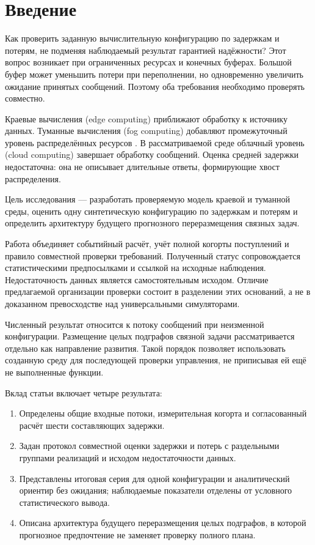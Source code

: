 \hypertarget{ux432ux432ux435ux434ux435ux43dux438ux435}{%
\section{Введение}}

Как проверить заданную вычислительную конфигурацию по задержкам и потерям, не подменяя наблюдаемый результат гарантией надёжности? Этот вопрос возникает при ограниченных ресурсах и конечных буферах. Большой буфер может уменьшить потери при переполнении, но одновременно увеличить ожидание принятых сообщений. Поэтому оба требования необходимо проверять совместно.

Краевые вычисления (edge computing) приближают обработку к источнику данных. Туманные вычисления (fog computing) добавляют промежуточный уровень распределённых ресурсов \cite{bonomi,shi}. В рассматриваемой среде облачный уровень (cloud computing) завершает обработку сообщений. Оценка средней задержки недостаточна: она не описывает длительные ответы, формирующие хвост распределения.

Цель исследования --- разработать проверяемую модель краевой и туманной среды, оценить одну синтетическую конфигурацию по задержкам и потерям и определить архитектуру будущего прогнозного переразмещения связных задач.

Работа объединяет событийный расчёт, учёт полной когорты поступлений и правило совместной проверки требований. Полученный статус сопровождается статистическими предпосылками и ссылкой на исходные наблюдения. Недостаточность данных является самостоятельным исходом. Отличие предлагаемой организации проверки состоит в разделении этих оснований, а не в доказанном превосходстве над универсальными симуляторами.

Численный результат относится к потоку сообщений при неизменной конфигурации. Размещение целых подграфов связной задачи рассматривается отдельно как направление развития. Такой порядок позволяет использовать созданную среду для последующей проверки управления, не приписывая ей ещё не выполненные функции.

Вклад статьи включает четыре результата:

\begin{enumerate}
\def\labelenumi{\arabic{enumi}.}
\tightlist
\item
  Определены общие входные потоки, измерительная когорта и согласованный расчёт шести составляющих задержки.
\item
  Задан протокол совместной оценки задержки и потерь с раздельными группами реализаций и исходом недостаточности данных.
\item
  Представлены итоговая серия для одной конфигурации и аналитический ориентир без ожидания; наблюдаемые показатели отделены от условного статистического вывода.
\item
  Описана архитектура будущего переразмещения целых подграфов, в которой прогнозное предпочтение не заменяет проверку полного плана.
\end{enumerate}

